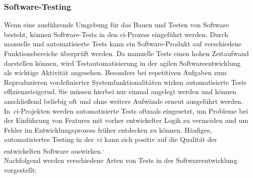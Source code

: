 \subsubsection{Software-Testing}

Wenn eine ausführende Umgebung für das Bauen und Testen von Software besteht, können Software-Tests in den
\acrshort{ci}-Prozess eingeführt werden.
Durch manuelle und automatisierte Tests kann ein Software-Produkt auf verschiedene Funktionsbereiche überprüft werden.
Da manuelle Tests einen hohen Zeitaufwand darstellen können, wird Testautomatisierung in der agilen Softwareentwicklung
als wichtige Aktivität angesehen.
Besonders bei repetitiven Aufgaben zum Reproduzieren vordefinierter Systemfunktionalitäten wirken automatisierte
Tests effizienzsteigernd.
Sie müssen hierbei nur einmal angelegt werden und können anschließend beliebig oft und ohne weitere Aufwände erneut
ausgeführt werden.
In\ \acrshort{ci}-Projekten werden automatisierte Tests oftmals eingesetzt, um Probleme bei der
Einführung von Features mit vorher entwickelter Logik zu vermeiden und um Fehler im Entwicklungsprozess früher
entdecken zu können.
Häufiges, automatisiertes Testing in der\ \acrshort{ci} kann sich positiv auf die Qualität der entwickelten Software
auswirken.\textsuperscript{,\ }
\\
Nachfolgend werden verschiedene Arten von Tests in der Softwareentwicklung vorgestellt:


